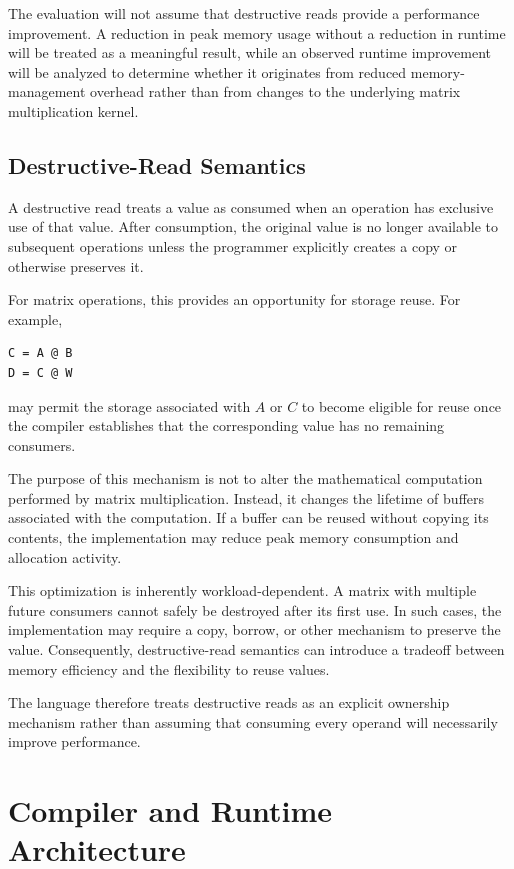 \documentclass[a4paper]{article}
\begin{document}
The evaluation will not assume that destructive reads provide a performance improvement. A reduction in peak memory usage without a reduction in runtime will be treated as a meaningful result, while an observed runtime improvement will be analyzed to determine whether it originates from reduced memory-management overhead rather than from changes to the underlying matrix multiplication kernel.

\subsection{Destructive-Read Semantics}

A destructive read treats a value as consumed when an operation has exclusive use of that value. After consumption, the original value is no longer available to subsequent operations unless the programmer explicitly creates a copy or otherwise preserves it.

For matrix operations, this provides an opportunity for storage reuse. For example,

\begin{lstlisting}
C = A @ B
D = C @ W
\end{lstlisting}

may permit the storage associated with $A$ or $C$ to become eligible for reuse once the compiler establishes that the corresponding value has no remaining consumers.

The purpose of this mechanism is not to alter the mathematical computation performed by matrix multiplication. Instead, it changes the lifetime of buffers associated with the computation. If a buffer can be reused without copying its contents, the implementation may reduce peak memory consumption and allocation activity.

This optimization is inherently workload-dependent. A matrix with multiple future consumers cannot safely be destroyed after its first use. In such cases, the implementation may require a copy, borrow, or other mechanism to preserve the value. Consequently, destructive-read semantics can introduce a tradeoff between memory efficiency and the flexibility to reuse values.

The language therefore treats destructive reads as an explicit ownership mechanism rather than assuming that consuming every operand will necessarily improve performance.

\section{Compiler and Runtime Architecture}
\end{document}
